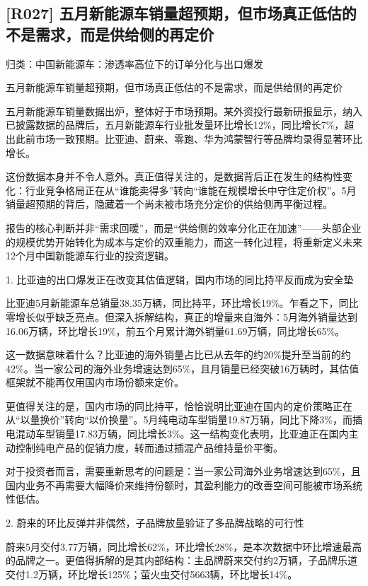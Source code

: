 \documentclass[11pt]{ctexart}
\begin{document}
\subsection{[R027] 五月新能源车销量超预期，但市场真正低估的不是需求，而是供给侧的再定价}
{\small\color{refgray}归类：中国新能源车：渗透率高位下的订单分化与出口爆发}

五月新能源车销量超预期，但市场真正低估的不是需求，而是供给侧的再定价

五月新能源车销量数据出炉，整体好于市场预期。某外资投行最新研报显示，纳入已披露数据的品牌后，五月新能源车行业批发量环比增长12\%，同比增长7\%，超出此前市场一致预期。比亚迪、蔚来、零跑、华为鸿蒙智行等品牌均录得显著环比增长。

这份数据本身并不令人意外。真正值得关注的，是数据背后正在发生的结构性变化：行业竞争格局正在从“谁能卖得多”转向“谁能在规模增长中守住定价权”。5月销量超预期的背后，隐藏着一个尚未被市场充分定价的供给侧再平衡过程。

报告的核心判断并非“需求回暖”，而是“供给侧的效率分化正在加速”——头部企业的规模优势开始转化为成本与定价的双重能力，而这一转化过程，将重新定义未来12个月中国新能源车行业的投资逻辑。

1. 比亚迪的出口爆发正在改变其估值逻辑，国内市场的同比持平反而成为安全垫

比亚迪5月新能源车总销量38.35万辆，同比持平，环比增长19\%。乍看之下，同比零增长似乎缺乏亮点。但深入拆解结构，真正的增量来自海外：5月海外销量达到16.06万辆，环比增长19\%，前五个月累计海外销量61.69万辆，同比增长65\%。

这一数据意味着什么？比亚迪的海外销量占比已从去年的约20\%提升至当前的约42\%。当一家公司的海外业务增速达到65\%，且月销量已经突破16万辆时，其估值框架就不能再仅用国内市场份额来定价。

更值得关注的是，国内市场的同比持平，恰恰说明比亚迪在国内的定价策略正在从“以量换价”转向“以价换量”。5月纯电动车型销量19.87万辆，同比下降3\%，而插电混动车型销量17.83万辆，同比增长3\%。这一结构变化表明，比亚迪正在国内主动控制纯电产品的促销力度，转而通过插混产品维持量价平衡。

对于投资者而言，需要重新思考的问题是：当一家公司海外业务增速达到65\%，且国内业务不再需要大幅降价来维持份额时，其盈利能力的改善空间可能被市场系统性低估。

2. 蔚来的环比反弹并非偶然，子品牌放量验证了多品牌战略的可行性

蔚来5月交付3.77万辆，同比增长62\%，环比增长28\%，是本次数据中环比增速最高的品牌之一。更值得拆解的是其内部结构：主品牌蔚来交付约2万辆，子品牌乐道交付1.2万辆，环比增长125\%；萤火虫交付5663辆，环比增长14\%。
\end{document}
